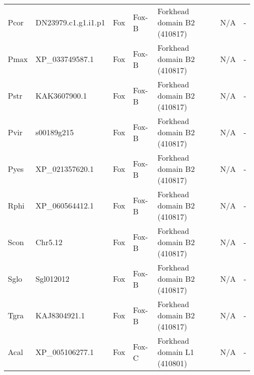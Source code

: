 \documentclass[../main.tex]{subfiles}
\begin{document}
\begin{landscape}
\begin{longtable}{lllllll}
		Pcor           & DN23979.c1.g1.i1.p1   & Fox            & Fox-B               & Forkhead domain B2 (410817)                 & N/A                                                                    & -                    \\
		Pmax           & XP\_033749587.1       & Fox            & Fox-B               & Forkhead domain B2 (410817)                 & N/A                                                                    & -                    \\
		Pstr           & KAK3607900.1          & Fox            & Fox-B               & Forkhead domain B2 (410817)                 & N/A                                                                    & -                    \\
		Pvir           & s00189g215            & Fox            & Fox-B               & Forkhead domain B2 (410817)                 & N/A                                                                    & -                    \\
		Pyes           & XP\_021357620.1       & Fox            & Fox-B               & Forkhead domain B2 (410817)                 & N/A                                                                    & -                    \\
		Rphi           & XP\_060564412.1       & Fox            & Fox-B               & Forkhead domain B2 (410817)                 & N/A                                                                    & -                    \\
		Scon           & Chr5.12               & Fox            & Fox-B               & Forkhead domain B2 (410817)                 & N/A                                                                    & -                    \\
		Sglo           & Sgl012012             & Fox            & Fox-B               & Forkhead domain B2 (410817)                 & N/A                                                                    & -                    \\
		Tgra           & KAJ8304921.1          & Fox            & Fox-B               & Forkhead domain B2 (410817)                 & N/A                                                                    & -                    \\
		Acal           & XP\_005106277.1       & Fox            & Fox-C               & Forkhead domain L1 (410801)                 & N/A                                                                    & -                    \\

\end{longtable}
\end{landscape}
\end{document}
